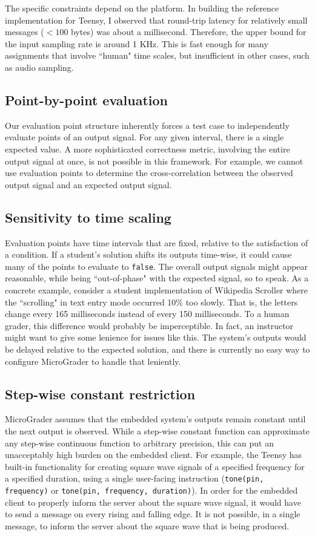 \documentclass[12pt]{article}
\begin{document}
The specific constraints depend on the platform.  In building the reference implementation for Teensy, I observed that round-trip latency for relatively small messages ($<100$ bytes) was about a millisecond.  Therefore, the upper bound for the input sampling rate is around 1 KHz.  This is fast enough for many assignments that involve ``human" time scales, but insufficient in other cases, such as audio sampling.

\subsection{Point-by-point evaluation}
Our evaluation point structure inherently forces a test case to independently evaluate points of an output signal.  For any given interval, there is a single expected value.   A more sophisticated correctness metric, involving the entire output signal at once, is not possible in this framework.  For example, we cannot use evaluation points to determine the cross-correlation between the observed output signal and an expected output signal.

\subsection{Sensitivity to time scaling}
Evaluation points have time intervals that are fixed, relative to the satisfaction of a condition.  If a student's solution shifts its outputs time-wise, it could cause many of the points to evaluate to \texttt{false}.  The overall output signals might appear reasonable, while being ``out-of-phase" with the expected signal, so to speak.  As a concrete example, consider a student implementation of Wikipedia Scroller where the ``scrolling" in text entry mode occurred 10\% too slowly.  That is, the letters change every 165 milliseconds instead of every 150 milliseconds.  To a human grader, this difference would probably be imperceptible.  In fact, an instructor might want to give some lenience for issues like this.  The system's outputs would be delayed relative to the expected solution, and there is currently no easy way to configure MicroGrader to handle that leniently.

\subsection{Step-wise constant restriction}
MicroGrader assumes that the embedded system's outputs remain constant until the next output is observed.  While a step-wise constant function can approximate any step-wise continuous function to arbitrary precision, this can put an unacceptably high burden on the embedded client.  For example, the Teensy has built-in functionality for creating square wave signals of a specified frequency for a specified duration, using a single user-facing instruction (\texttt{tone(pin, frequency)} or \texttt{tone(pin, frequency, duration)}).  In order for the embedded client to properly inform the server about the square wave signal, it would have to send a message on every rising and falling edge.  It is not possible, in a single message, to inform the server about the square wave that is being produced.
\end{document}
